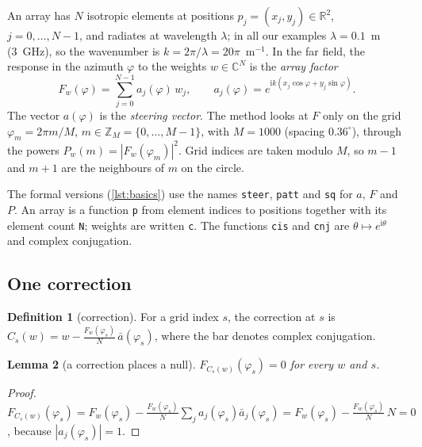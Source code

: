 \documentclass[11pt]{amsart}
\theoremstyle{plain}
\newtheorem{lemma}{Lemma}[section]
\theoremstyle{definition}
\newtheorem{definition}[lemma]{Definition}
\newcommand{\thy}[1]{\texttt{#1}}
\newcommand{\C}{\mathbb{C}}
\newcommand{\R}{\mathbb{R}}
\newcommand{\Z}{\mathbb{Z}}
\newcommand{\ab}{\bar a}
\begin{document}
An array has $N$ isotropic elements at positions $p_j = (x_j, y_j) \in \R^2$, $j = 0, \dots, N-1$,
and radiates at wavelength $\lambda$; in all our examples $\lambda = 0.1$~m (3~GHz), so the
wavenumber is $k = 2\pi/\lambda = 20\pi$~m$^{-1}$.  In the far field, the response in the azimuth
$\varphi$ to the weights $w \in \C^N$ is the \emph{array factor}
\begin{equation}\label{eq:pattern}
F_w(\varphi) = \sum_{j=0}^{N-1} a_j(\varphi)\, w_j, \qquad
a_j(\varphi) = e^{\mathrm{i} k (x_j \cos\varphi + y_j \sin\varphi)} .
\end{equation}
The vector $a(\varphi)$ is the \emph{steering vector}.  The method looks at $F$ only on the grid
$\varphi_m = 2\pi m/M$, $m \in \Z_M = \{0, \dots, M-1\}$, with $M = 1000$ (spacing $0.36^\circ$),
through the powers $P_w(m) = |F_w(\varphi_m)|^2$.  Grid indices are taken modulo $M$, so $m-1$ and
$m+1$ are the neighbours of $m$ on the circle.

The formal versions (\cref{lst:basics}) use the names \thy{steer}, \thy{patt} and \thy{sq} for
$a$, $F$ and $P$.  An array is a function \thy{p} from element indices to positions together with
its element count \thy{N}; weights are written \thy{c}.  The functions \thy{cis} and \thy{cnj} are
$\theta \mapsto e^{\mathrm{i}\theta}$ and complex conjugation.



\subsection{One correction}

\begin{definition}[correction]
For a grid index $s$, the correction at $s$ is
$C_s(w) = w - \frac{F_w(\varphi_s)}{N}\, \ab(\varphi_s)$, where the bar denotes complex conjugation.
\end{definition}

\begin{lemma}[a correction places a null]\label{lem:null}
$F_{C_s(w)}(\varphi_s) = 0$ for every $w$ and $s$.
\end{lemma}

\begin{proof}
$F_{C_s(w)}(\varphi_s) = F_w(\varphi_s) - \frac{F_w(\varphi_s)}{N}\sum_j a_j(\varphi_s)\ab_j(\varphi_s)
= F_w(\varphi_s) - \frac{F_w(\varphi_s)}{N}\, N = 0$, because $|a_j(\varphi_s)| = 1$.
\end{proof}
\end{document}
